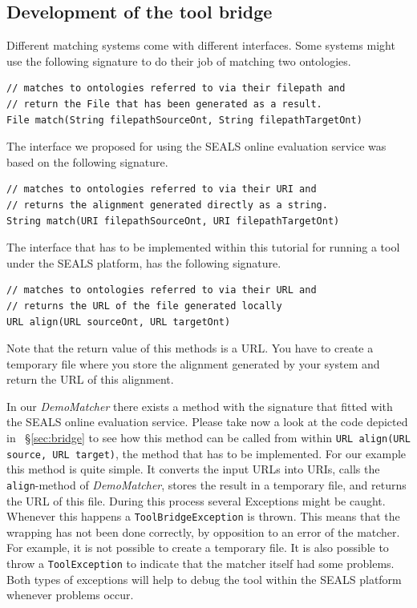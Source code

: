 \documentclass{article}
\def\tool#1{\textsl{#1}}
\begin{document}
\subsection{Development of the tool bridge}
\label{sec:toolbridge}

Different matching systems come with different interfaces. Some systems might use the following signature to do their job of matching two ontologies.
\begin{verbatim}
// matches to ontologies referred to via their filepath and
// return the File that has been generated as a result.
File match(String filepathSourceOnt, String filepathTargetOnt)
\end{verbatim}
The interface we proposed for using the SEALS online evaluation service was based on the following signature.
\begin{verbatim}
// matches to ontologies referred to via their URI and
// returns the alignment generated directly as a string.
String match(URI filepathSourceOnt, URI filepathTargetOnt)
\end{verbatim} 
The interface that has to be implemented within this tutorial for running a tool under the SEALS platform, has the following signature.
\begin{verbatim}
// matches to ontologies referred to via their URL and
// returns the URL of the file generated locally
URL align(URL sourceOnt, URL targetOnt)
\end{verbatim} 
Note that the return value of this methods is a URL. You have to create a temporary file where you store the alignment generated by your system and return the URL of this alignment.

In our \tool{DemoMatcher} there exists a method with the signature that fitted with the SEALS online evaluation service. Please take now a look at the code depicted in ~\S\ref{sec:bridge} to see how this method can be called from within \verb|URL align(URL source, URL target)|, the method that has to be implemented. For our example this method is quite simple. It converts the input URLs into URIs, calls the \verb|align|-method of \tool{DemoMatcher}, stores the result in a temporary file, and returns the URL of this file. During this process several Exceptions might be caught. Whenever this happens a \verb|ToolBridgeException| is thrown. This means that the wrapping has not been done correctly, by opposition to an error of the matcher. For example, it is not possible to create a temporary file. It is also possible to throw a \verb|ToolException| to indicate that the matcher itself had some problems. Both types of exceptions will help to debug the tool within the SEALS platform whenever problems occur. 
\end{document}
